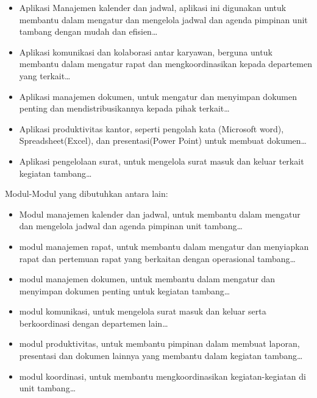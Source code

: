 \documentclass[a4paper, 12pt]{article}
\begin{document}
\begin{itemize}
  \item Aplikasi Manajemen kalender dan jadwal, aplikasi ini digunakan untuk membantu dalam mengatur dan mengelola jadwal dan agenda pimpinan unit tambang dengan mudah dan efisien\dots
  \item Aplikasi komunikasi dan kolaborasi antar karyawan, berguna untuk membantu dalam mengatur rapat dan mengkoordinasikan kepada departemen yang terkait\dots
  \item Aplikasi manajemen dokumen, untuk mengatur dan menyimpan dokumen penting dan mendistribusikannya kepada pihak terkait\dots
  \item Aplikasi produktivitas kantor, seperti pengolah kata (Microsoft word), Spreadsheet(Excel), dan presentasi(Power Point) untuk membuat dokumen\dots
  \item Aplikasi pengelolaan surat, untuk mengelola surat masuk dan keluar terkait kegiatan tambang\dots
\end{itemize}
Modul-Modul yang dibutuhkan antara lain:
\begin{itemize}
  \item Modul manajemen kalender dan jadwal, untuk membantu dalam mengatur dan mengelola jadwal dan agenda pimpinan unit tambang\dots
  \item modul manajemen rapat, untuk membantu dalam mengatur dan menyiapkan rapat dan pertemuan rapat yang berkaitan dengan operasional tambang\dots
  \item modul manajemen dokumen, untuk membantu dalam mengatur dan menyimpan dokumen penting untuk kegiatan tambang\dots
  \item modul komunikasi, untuk mengelola surat masuk dan keluar serta berkoordinasi dengan departemen lain\dots
  \item modul produktivitas, untuk membantu pimpinan dalam membuat laporan, presentasi dan dokumen lainnya yang membantu dalam kegiatan tambang\dots
  \item modul koordinasi, untuk membantu mengkoordinasikan kegiatan-kegiatan di unit tambang\dots
\end{itemize}
\end{document}
